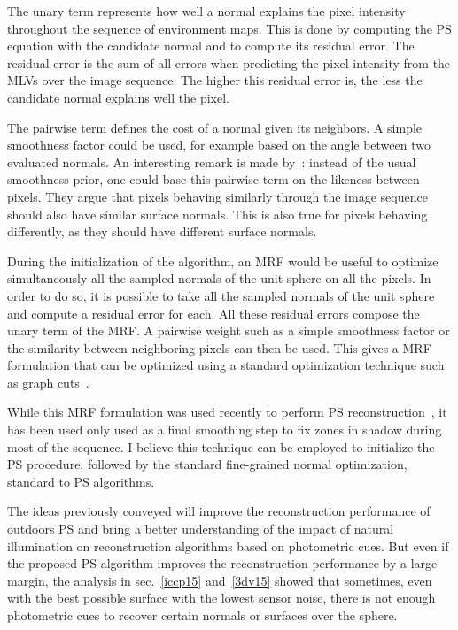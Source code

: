 The unary term represents how well a normal explains the pixel intensity throughout the sequence of environment maps. This is done by computing the PS equation with the candidate normal and to compute its residual error. The residual error is the sum of all errors when predicting the pixel intensity from the MLVs over the image sequence. The higher this residual error is, the less the candidate normal explains well the pixel.

The pairwise term defines the cost of a normal given its neighbors. A simple smoothness factor could be used, for example based on the angle between two evaluated normals. An interesting remark is made by~\cite{jung-cvpr-15}: instead of the usual smoothness prior, one could base this pairwise term on the likeness between pixels. They argue that pixels behaving similarly through the image sequence should also have similar surface normals. This is also true for pixels behaving differently, as they should have different surface normals.

During the initialization of the algorithm, an MRF would be useful to optimize simultaneously all the sampled normals of the unit sphere on all the pixels. In order to do so, it is possible to take all the sampled normals of the unit sphere and compute a residual error for each. All these residual errors compose the unary term of the MRF. A pairwise weight such as a simple smoothness factor or the similarity between neighboring pixels can then be used. This gives a MRF formulation that can be optimized using a standard optimization technique such as graph cuts~\cite{Boykov2001a,Kolmogorov2004a,Boykov2004,Bagon2006}.

While this MRF formulation was used recently to perform PS reconstruction~\cite{jung-cvpr-15}, it has been used only used as a final smoothing step to fix zones in shadow during most of the sequence. I believe this technique can be employed to initialize the PS procedure, followed by the standard fine-grained normal optimization, standard to PS algorithms.


The ideas previously conveyed will improve the reconstruction performance of outdoors PS and bring a better understanding of the impact of natural illumination on reconstruction algorithms based on photometric cues. But even if the proposed PS algorithm improves the reconstruction performance by a large margin, the analysis in sec.~\ref{iccp15} and~\ref{3dv15} showed that sometimes, even with the best possible surface with the lowest sensor noise, there is not enough photometric cues to recover certain normals or surfaces over the sphere.

